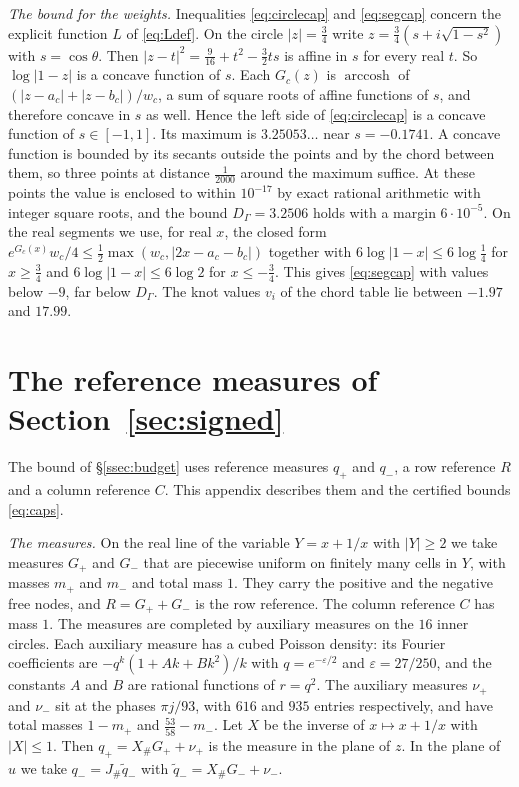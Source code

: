 \documentclass[11pt]{amsart}
\newcommand{\Dcirc}{3.2506}
\theoremstyle{definition}
\theoremstyle{remark}
\numberwithin{equation}{section}
\begin{document}
\emph{The bound for the weights.} Inequalities \eqref{eq:circlecap} and \eqref{eq:segcap} concern the explicit function $L$ of
\eqref{eq:Ldef}. On the circle $|z|=\frac34$ write $z=\frac34(s+i\sqrt{1-s^2})$ with $s=\cos\theta$. Then $|z-t|^2=\frac9{16}+t^2-\frac32ts$
is affine in $s$ for every real $t$. So $\log|1-z|$ is a concave function of $s$. Each $G_c(z)$ is $\operatorname{arccosh}$ of
$(|z-a_c|+|z-b_c|)/w_c$, a sum of square roots of affine functions of $s$, and therefore concave in $s$ as well. Hence the left
side of \eqref{eq:circlecap} is a concave function of $s\in[-1,1]$. Its maximum is $3.25053\ldots$ near $s=-0.1741$. A concave function
is bounded by its secants outside the points and by the chord between them, so three points at distance $\frac1{2000}$ around the
maximum suffice. At these points the value is enclosed to within $10^{-17}$ by exact rational arithmetic with integer square roots,
and the bound $D_\Gamma=\Dcirc$ holds with a margin $6\cdot10^{-5}$. On the real segments we use, for real $x$, the closed form
$e^{G_c(x)}w_c/4\le\frac12\max(w_c,|2x-a_c-b_c|)$ together with $6\log|1-x|\le6\log\frac14$ for $x\ge\frac34$ and
$6\log|1-x|\le6\log2$ for $x\le-\frac34$. This gives \eqref{eq:segcap} with values below $-9$, far below $D_\Gamma$.
The knot values $v_i$ of the chord table lie between $-1.97$ and $17.99$.

\section{The reference measures of Section~\ref{sec:signed}}\label{app:trials}

The bound of \S\ref{ssec:budget} uses reference measures $q_+$ and $q_-$, a row reference $R$ and a column reference $C$.
This appendix describes them and the certified bounds \eqref{eq:caps}.

\emph{The measures.} On the real line of the variable $Y=x+1/x$ with $|Y|\ge2$ we take measures $G_+$ and $G_-$ that
are piecewise uniform on finitely many cells in $Y$, with masses $m_+$ and $m_-$ and total mass $1$. They carry the positive and the
negative free nodes, and $R=G_++G_-$ is the row reference. The column reference $C$ has mass $1$. The measures are completed by
auxiliary measures on the $16$ inner circles. Each auxiliary measure has a cubed Poisson density: its Fourier coefficients
are $-q^k(1+Ak+Bk^2)/k$ with $q=e^{-\varepsilon/2}$ and $\varepsilon=27/250$, and the constants $A$ and $B$ are rational functions of $r=q^2$.
The auxiliary measures $\nu_+$ and $\nu_-$ sit at the phases $\pi j/93$, with $616$ and $935$ entries respectively, and have total masses $1-m_+$ and $\frac{53}{58}-m_-$. Let $X$ be the inverse of $x\mapsto x+1/x$ with $|X|\le1$. Then
$q_+=X_\#G_++\nu_+$ is the measure in the plane of $z$. In the plane of $u$ we take $q_-=J_\#\tilde q_-$ with $\tilde q_-=X_\#G_-+\nu_-$.
\end{document}
